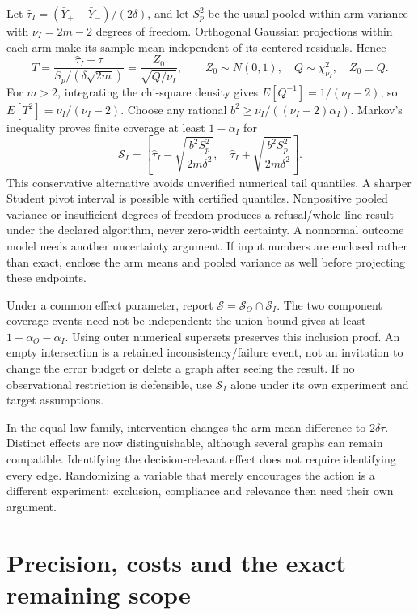 Let \(\widehat\tau_I=(\bar Y_+-\bar Y_-)/(2\delta)\), and let \(S_p^2\)
be the usual pooled within-arm variance with \(\nu_I=2m-2\) degrees of
freedom. Orthogonal Gaussian projections within each arm make its sample
mean independent of its centered residuals. Hence \[
 T=\frac{\widehat\tau_I-\tau}{S_p/(\delta\sqrt{2m})}
   =\frac{Z_0}{\sqrt{Q/\nu_I}},\qquad
 Z_0\sim N(0,1),\quad Q\sim\chi^2_{\nu_I},\quad Z_0\perp Q.
\] For \(m>2\), integrating the chi-square density gives
\(E[Q^{-1}]=1/(\nu_I-2)\), so \(E[T^2]=\nu_I/(\nu_I-2)\). Choose any
rational \(b^2\ge\nu_I/((\nu_I-2)\alpha_I)\). Markov's inequality proves
finite coverage at least \(1-\alpha_I\) for \[
 \mathcal S_I=\left[\widehat\tau_I-
  \sqrt{\frac{b^2S_p^2}{2m\delta^2}},\quad
  \widehat\tau_I+\sqrt{\frac{b^2S_p^2}{2m\delta^2}}\right].
\] This conservative alternative avoids unverified numerical tail
quantiles. A sharper Student pivot interval is possible with certified
quantiles. Nonpositive pooled variance or insufficient degrees of
freedom produces a refusal/whole-line result under the declared
algorithm, never zero-width certainty. A nonnormal outcome model needs
another uncertainty argument. If input numbers are enclosed rather than
exact, enclose the arm means and pooled variance as well before
projecting these endpoints.

Under a common effect parameter, report
\(\mathcal S=\mathcal S_O\cap\mathcal S_I\). The two component coverage
events need not be independent: the union bound gives at least
\(1-\alpha_O-\alpha_I\). Using outer numerical supersets preserves this
inclusion proof. An empty intersection is a retained
inconsistency/failure event, not an invitation to change the error
budget or delete a graph after seeing the result. If no observational
restriction is defensible, use \(\mathcal S_I\) alone under its own
experiment and target assumptions.

In the equal-law family, intervention changes the arm mean difference to
\(2\delta\tau\). Distinct effects are now distinguishable, although
several graphs can remain compatible. Identifying the decision-relevant
effect does not require identifying every edge. Randomizing a variable
that merely encourages the action is a different experiment: exclusion,
compliance and relevance then need their own argument.

\hypertarget{precision-costs-and-the-exact-remaining-scope}{%
\section{Precision, costs and the exact remaining
scope}\label{precision-costs-and-the-exact-remaining-scope}}

